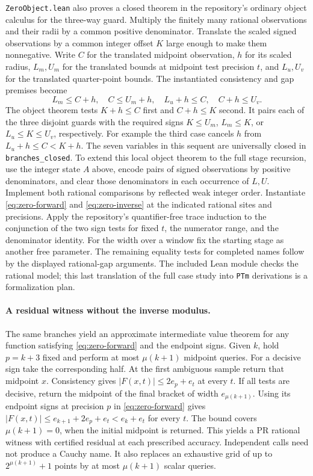 \texttt{ZeroObject.lean} also proves a closed theorem in the repository's
ordinary object calculus for the three-way guard. Multiply the finitely
many rational observations and their radii by a common positive denominator.
Translate the scaled signed observations by a common integer offset $K$
large enough to make them nonnegative. Write $C$ for the translated midpoint
observation, $h$ for its scaled radius, $L_m,U_m$ for the translated bounds
at midpoint test precision $t$, and $L_u,U_v$ for the translated quarter-point
bounds. The instantiated consistency and gap premises become
\[
 L_m\le C+h,\quad C\le U_m+h,\quad L_u+h\le C,\quad C+h\le U_v.
\]
The object theorem tests $K+h\le C$ first and $C+h\le K$ second.
It pairs each of the three disjoint guards with the required signs
$K\le U_m$, $L_m\le K$, or $L_u\le K\le U_v$, respectively.
For example the third case cancels $h$ from
$L_u+h\le C<K+h$. The seven variables in this sequent are universally
closed in \texttt{branches\_closed}. To extend this local object theorem
to the full stage recursion, use the integer
state $A$ above, encode pairs of signed observations by positive
denominators, and clear those denominators in each occurrence of $L,U$.
Implement both rational comparisons by reflected weak integer order.
Instantiate \eqref{eq:zero-forward} and \eqref{eq:zero-inverse} at the
indicated rational sites and precisions. Apply the repository's
quantifier-free trace induction to the conjunction of the two sign tests
for fixed $t$, the numerator range, and the denominator identity.
For the width over a window fix the starting stage as another free
parameter. The remaining equality tests for completed names follow by the
displayed rational-gap arguments. The included Lean module checks the
rational model; this last translation of the full case study into
\texttt{PTm} derivations is a formalization plan.

\paragraph{A residual witness without the inverse modulus.}
The same branches yield an approximate intermediate value theorem for any
function satisfying \eqref{eq:zero-forward} and the endpoint signs.
Given $k$, hold $p=k+3$ fixed and perform at most $\mu(k+1)$ midpoint queries.
For a decisive sign take the corresponding half. At the first ambiguous
sample return that midpoint $x$. Consistency gives
$|F(x,t)|\le 2e_p+e_t$ at every $t$. If all tests are decisive, return
the midpoint of the final bracket of width $e_{\mu(k+1)}$.
Using its endpoint signs at precision $p$ in \eqref{eq:zero-forward}
gives $|F(x,t)|\le e_{k+1}+2e_p+e_t<e_k+e_t$ for every $t$.
The bound covers $\mu(k+1)=0$, when the initial midpoint is returned.
This yields a PR rational witness with certified residual at each
prescribed accuracy. Independent calls need not produce a Cauchy name.
It also replaces an exhaustive grid of up to $2^{\mu(k+1)}+1$ points
by at most $\mu(k+1)$ scalar queries.

